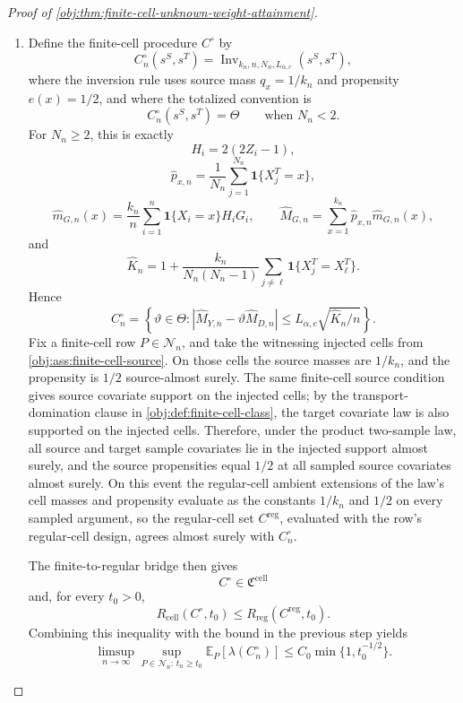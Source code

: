 \documentclass[11pt]{article}
\begin{document}
\begin{proof}[Proof of \cref{obj:thm:finite-cell-unknown-weight-attainment}]
\begin{enumerate}
\item
Define the finite-cell procedure \(C^\circ\) by
\[
C^\circ_n(s^S,s^T)
=
\operatorname{Inv}_{k_n,n,N_n,L_{\alpha,c}}(s^S,s^T),
\]
where the inversion rule uses source mass \(q_x=1/k_n\) and propensity \(e(x)=1/2\), and where the totalized convention is
\[
C^\circ_n(s^S,s^T)=\Theta
\qquad\text{when }N_n<2.
\]
For \(N_n\ge2\), this is exactly
\[
H_i=2(2Z_i-1),
\]
\[
\widehat p_{x,n}=\frac1{N_n}\sum_{j=1}^{N_n}\mathbf 1\{X_j^T=x\},
\]
\[
\widehat m_{G,n}(x)
=
\frac{k_n}{n}\sum_{i=1}^n
\mathbf 1\{X_i=x\}H_iG_i,
\qquad
\widehat M_{G,n}
=
\sum_{x=1}^{k_n}\widehat p_{x,n}\widehat m_{G,n}(x),
\]
and
\[
\widehat K_n
=
1+
\frac{k_n}{N_n(N_n-1)}
\sum_{j\ne\ell}\mathbf 1\{X_j^T=X_\ell^T\}.
\]
Hence
\[
C^\circ_n
=
\left\{\vartheta\in\Theta:
|\widehat M_{Y,n}-\vartheta\widehat M_{D,n}|
\le
L_{\alpha,c}\sqrt{\widehat K_n/n}
\right\}.
\]
Fix a finite-cell row \(P\in\mathcal N_n\), and take the witnessing injected cells from \cref{obj:ass:finite-cell-source}.  On those cells the source masses are \(1/k_n\), and the propensity is \(1/2\) source-almost surely.  The same finite-cell source condition gives source covariate support on the injected cells; by the transport-domination clause in \cref{obj:def:finite-cell-class}, the target covariate law is also supported on the injected cells.  Therefore, under the product two-sample law, all source and target sample covariates lie in the injected support almost surely, and the source propensities equal \(1/2\) at all sampled source covariates almost surely.  On this event the regular-cell ambient extensions of the law's cell masses and propensity evaluate as the constants \(1/k_n\) and \(1/2\) on every sampled argument, so the regular-cell set \(C^{\mathrm{reg}}\), evaluated with the row's regular-cell design, agrees almost surely with \(C^\circ_n\).

The finite-to-regular bridge then gives
\[
C^\circ\in\mathfrak C^{\mathrm{cell}}
\]
and, for every \(t_0>0\),
\[
R_{\mathrm{cell}}(C^\circ,t_0)
\le
R_{\mathrm{reg}}(C^{\mathrm{reg}},t_0).
\]
Combining this inequality with the bound in the previous step yields
\[
\limsup_{n\to\infty}
\sup_{P\in\mathcal N_n:\,t_n\ge t_0}
\mathbb E_P[\lambda(C^\circ_n)]
\le
C_0\min\{1,t_0^{-1/2}\}.
\]


\end{enumerate}
\end{proof}
\end{document}
